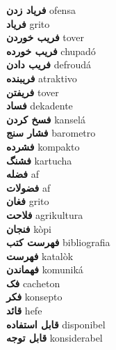 \textbf{ فریاد زدن  } ofensa \\
\textbf{ فریاد  } grito \\
\textbf{ فریب خوردن  } tover \\
\textbf{ فریب خورده  } chupadó \\
\textbf{ فریب دادن  } defroudá \\
\textbf{ فریبنده  } atraktivo \\
\textbf{ فریفتن  } tover \\
\textbf{ فساد  } dekadente \\
\textbf{ فسخ کردن  } kanselá \\
\textbf{ فشار سنج  } barometro \\
\textbf{ فشرده  } kompakto \\
\textbf{ فشنگ  } kartucha \\
\textbf{ فضله  } af \\
\textbf{ فضولات  } af \\
\textbf{ فغان  } grito \\
\textbf{ فلاحت  } agrikultura \\
\textbf{ فنجان  } kòpi \\
\textbf{ فهرست کتب  } bibliografia \\
\textbf{ فهرست  } katalòk \\
\textbf{ فهماندن  } komuniká \\
\textbf{ فک  } cacheton \\
\textbf{ فکر  } konsepto \\
\textbf{ قائد  } hefe \\
\textbf{ قابل استفاده  } disponibel \\
\textbf{ قابل توجه  } konsiderabel \\
